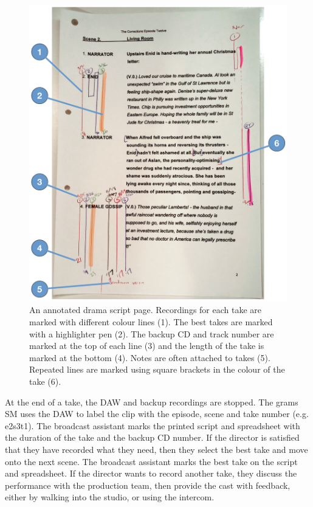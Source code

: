 \begin{figure}[p]
  \centering
  \includegraphics[width=\columnwidth]{figs/drama-markup-labelled.pdf}
  \caption{An annotated drama script page. Recordings for each take are marked with different colour lines (1). The
  best takes are marked with a highlighter pen (2). The backup CD and track number are marked at the top of each line
  (3) and the length of the take is marked at the bottom (4). Notes are often attached to takes (5). Repeated lines are
  marked using square brackets in the colour of the take (6).}
  \label{fig:drama-script}
\end{figure}

At the end of a take, the DAW and backup recordings are stopped. The grams SM uses the DAW to label the clip with the
episode, scene and take number (e.g. e2s3t1). The broadcast assistant marks the printed script and spreadsheet with the
duration of the take and the backup CD number.  If the director is satisfied that they have recorded what they need,
then they select the best take and move onto the next scene. The broadcast assistant marks the best take on the script
and spreadsheet. If the director wants to record another take, they discuss the performance with the production team,
then provide the cast with feedback, either by walking into the studio, or using the intercom.

